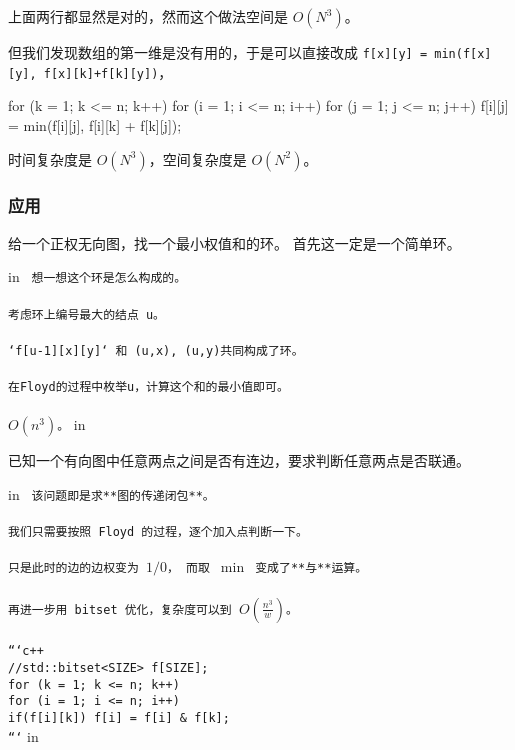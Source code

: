 上面两行都显然是对的，然而这个做法空间是 $O(N^3)$。

但我们发现数组的第一维是没有用的，于是可以直接改成 \texttt{f[x][y] = min(f[x][y], f[x][k]+f[k][y])}，

\begin{cppcode}
for (k = 1; k <= n; k++) {
  for (i = 1; i <= n; i++) {
    for (j = 1; j <= n; j++) {
      f[i][j] = min(f[i][j], f[i][k] + f[k][j]);
    }
  }
}
\end{cppcode}

时间复杂度是 $O(N^3)$，空间复杂度是 $O(N^2)$。

\subsubsection{应用}

\begin{QUESTION}{给一个正权无向图，找一个最小权值和的环。}{}
首先这一定是一个简单环。
\end{QUESTION}


 in
\texttt{
想一想这个环是怎么构成的。\\\\考虑环上编号最大的结点 u。\\\\`f[u-1][x][y]` 和 (u,x), (u,y)共同构成了环。\\\\在Floyd的过程中枚举u，计算这个和的最小值即可。\\\\$O(n^3)$。}
 in

\begin{QUESTION}{已知一个有向图中任意两点之间是否有连边，要求判断任意两点是否联通。}{}

\end{QUESTION}


 in
\texttt{
该问题即是求**图的传递闭包**。\\\\我们只需要按照 Floyd 的过程，逐个加入点判断一下。\\\\只是此时的边的边权变为 $1/0$， 而取 $\min$ 变成了**与**运算。\\\\再进一步用 bitset 优化，复杂度可以到 $O(\frac{n^3}{w})$。\\\\```c++\\//std::bitset<SIZE> f[SIZE];\\for (k = 1; k <= n; k++)\\	for (i = 1; i <= n; i++)\\	    if(f[i][k]) f[i] = f[i] & f[k];\\```}
 in


